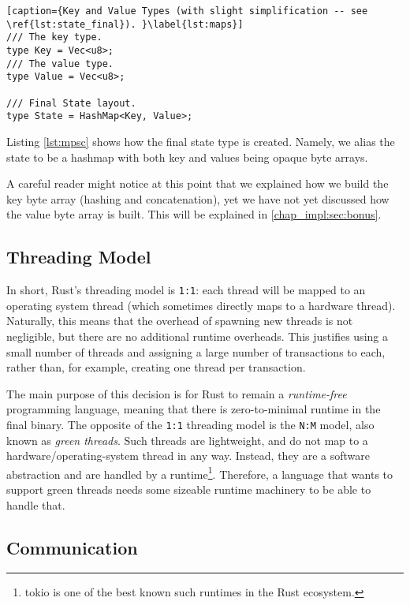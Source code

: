 \begin{lstlisting}[caption={Key and Value Types (with slight simplification -- see \ref{lst:state_final}). }\label{lst:maps}]
/// The key type.
type Key = Vec<u8>;
/// The value type.
type Value = Vec<u8>;

/// Final State layout.
type State = HashMap<Key, Value>;
\end{lstlisting}

Listing \ref{lst:mpsc} shows how the final state type is created. Namely, we alias the state to be a hashmap with both key and values being opaque byte arrays.

\begin{remark}
	A careful reader might notice at this point that we explained how we build the key byte array
	(hashing and concatenation), yet we have not yet discussed how the value byte array is built.
	This will be explained in \ref{chap_impl:sec:bonus}.
\end{remark}

\subsection{Threading Model}

In short, Rust's threading model is \texttt{1:1}: each thread will be mapped to an
operating system thread (which sometimes directly maps to a hardware thread). Naturally, this means
that the overhead of spawning new threads is not negligible, but there are no additional runtime
overheads. This justifies using a small number of threads and assigning a large number of
transactions to each, rather than, for example, creating one thread per transaction.

The main purpose of this decision is for Rust to remain a \textit{runtime-free} programming
language\cite{RustJourneyAsync}, meaning that there is zero-to-minimal runtime in the final binary.
The opposite of the \texttt{1:1} threading model is the \texttt{N:M} model, also known as
\textit{green threads}. Such threads are lightweight, and do not map to a hardware/operating-system
thread in any way. Instead, they are a software abstraction and are handled by a
runtime\footnote{tokio is one of the best known such runtimes in the Rust
ecosystem\cite{TokioRust}.}. Therefore, a language that wants to support green threads needs some sizeable runtime machinery to be able to handle that.

\subsection{Communication}

